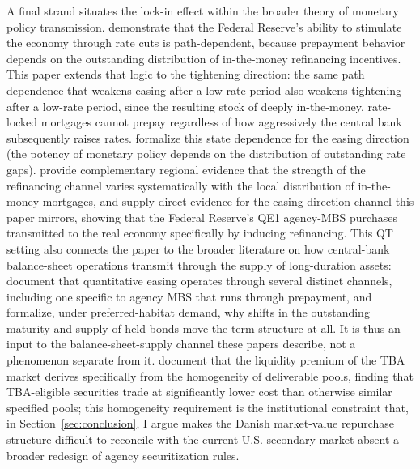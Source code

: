 \documentclass[12pt]{article}
\begin{document}
A final strand situates the lock-in effect within the broader theory of monetary policy transmission. \citet{berger2021} demonstrate that the Federal Reserve's ability to stimulate the economy through rate cuts is path-dependent, because prepayment behavior depends on the outstanding distribution of in-the-money refinancing incentives. This paper extends that logic to the tightening direction: the same path dependence that weakens easing after a low-rate period also weakens tightening after a low-rate period, since the resulting stock of deeply in-the-money, rate-locked mortgages cannot prepay regardless of how aggressively the central bank subsequently raises rates. \citet{eichenbaum2022} formalize this state dependence for the easing direction (the potency of monetary policy depends on the distribution of outstanding rate gaps). \citet{beraja2019} provide complementary regional evidence that the strength of the refinancing channel varies systematically with the local distribution of in-the-money mortgages, and \citet{dimaggio2020} supply direct evidence for the easing-direction channel this paper mirrors, showing that the Federal Reserve's QE1 agency-MBS purchases transmitted to the real economy specifically by inducing refinancing. This QT setting also connects the paper to the broader literature on how central-bank balance-sheet operations transmit through the supply of long-duration assets: \citet{krishnamurthy2011} document that quantitative easing operates through several distinct channels, including one specific to agency MBS that runs through prepayment, and \citet{vayanos2021} formalize, under preferred-habitat demand, why shifts in the outstanding maturity and supply of held bonds move the term structure at all. It is thus an input to the balance-sheet-supply channel these papers describe, not a phenomenon separate from it. \citet{vickery2013} document that the liquidity premium of the TBA market derives specifically from the homogeneity of deliverable pools, finding that TBA-eligible securities trade at significantly lower cost than otherwise similar specified pools; this homogeneity requirement is the institutional constraint that, in Section~\ref{sec:conclusion}, I argue makes the Danish market-value repurchase structure difficult to reconcile with the current U.S. secondary market absent a broader redesign of agency securitization rules.
\end{document}
